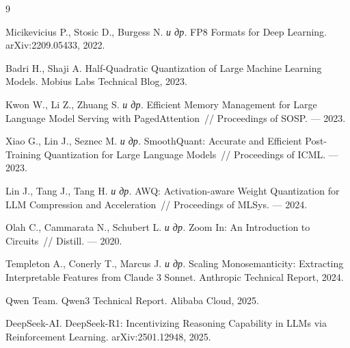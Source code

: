 \documentclass[a4paper,12pt]{article}
\begin{document}
\renewcommand{\refname}{Список использованных источников}
\begin{thebibliography}{9}

Micikevicius P., Stosic D., Burgess N. \textit{и др.}
FP8 Formats for Deep Learning.
arXiv:2209.05433, 2022.

Badri H., Shaji A.
Half-Quadratic Quantization of Large Machine Learning Models.
Mobius Labs Technical Blog, 2023.

Kwon W., Li Z., Zhuang S. \textit{и др.}
Efficient Memory Management for Large Language Model Serving with PagedAttention~//
Proceedings of SOSP. --- 2023.

Xiao G., Lin J., Seznec M. \textit{и др.}
SmoothQuant: Accurate and Efficient Post-Training Quantization for Large Language Models~//
Proceedings of ICML. --- 2023.

Lin J., Tang J., Tang H. \textit{и др.}
AWQ: Activation-aware Weight Quantization for LLM Compression and Acceleration~//
Proceedings of MLSys. --- 2024.

Olah C., Cammarata N., Schubert L. \textit{и др.}
Zoom In: An Introduction to Circuits~//
Distill. --- 2020.

Templeton A., Conerly T., Marcus J. \textit{и др.}
Scaling Monosemanticity: Extracting Interpretable Features from Claude 3 Sonnet.
Anthropic Technical Report, 2024.

Qwen Team.
Qwen3 Technical Report.
Alibaba Cloud, 2025.

DeepSeek-AI.
DeepSeek-R1: Incentivizing Reasoning Capability in LLMs via Reinforcement Learning.
arXiv:2501.12948, 2025.

\end{thebibliography}
\end{document}
